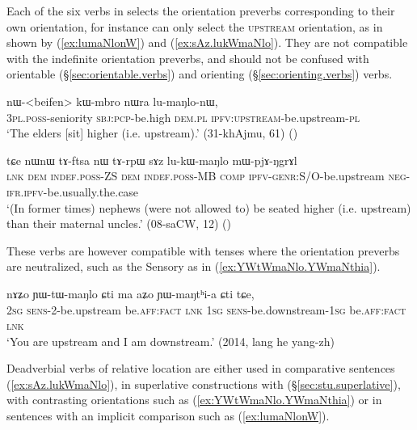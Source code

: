 Each of the six verbs in  selects the orientation preverbs corresponding to their own orientation, for instance  can only select the \textsc{upstream} orientation, as in shown by (\ref{ex:lumaNlonW}) and (\ref{ex:sAz.lukWmaNlo}). They are not compatible with the indefinite orientation preverbs, and should not be confused with orientable (§\ref{sec:orientable.verbs}) and orienting (§\ref{sec:orienting.verbs}) verbs.

\begin{exe}
\ex \label{ex:lumaNlonW}
\gll  nɯ-<beifen> kɯ-mbro nɯra lu-maŋlo-nɯ, \\
\textsc{3pl}.\textsc{poss}-seniority \textsc{sbj}:\textsc{pcp}-be.high \textsc{dem}.\textsc{pl} \textsc{ipfv}:\textsc{upstream}-be.upstream-\textsc{pl} \\
\glt `The elders [sit] higher (i.e. upstream).' (31-khAjmu, 61) ()
\end{exe}

\begin{exe}
\ex \label{ex:sAz.lukWmaNlo}
\gll  tɕe nɯnɯ tɤ-ftsa nɯ tɤ-rpɯ sɤz lu-kɯ-maŋlo mɯ-pjɤ-ŋgrɤl \\
\textsc{lnk} \textsc{dem} \textsc{indef}.\textsc{poss}-ZS \textsc{dem} \textsc{indef}.\textsc{poss}-MB \textsc{comp} \textsc{ipfv}-\textsc{genr}:S/O-be.upstream \textsc{neg}-\textsc{ifr}.\textsc{ipfv}-be.usually.the.case \\
\glt `(In former times) nephews (were not allowed to) be seated higher (i.e. upstream) than their maternal uncles.' (08-saCW, 12) ()
\end{exe}

These verbs are however compatible with tenses where the orientation preverbs are neutralized, such as the Sensory  as in (\ref{ex:YWtWmaNlo.YWmaNthia}).

\begin{exe}
\ex \label{ex:YWtWmaNlo.YWmaNthia}
\gll  nɤʑo ɲɯ-tɯ-maŋlo ɕti ma aʑo ɲɯ-maŋtʰi-a ɕti tɕe, \\
\textsc{2sg} \textsc{sens}-2-be.upstream be.\textsc{aff}:\textsc{fact} \textsc{lnk} \textsc{1sg} \textsc{sens}-be.downstream-\textsc{1sg} be.\textsc{aff}:\textsc{fact} \textsc{lnk} \\
\glt `You are upstream and I am downstream.' (2014, lang he yang-zh)
\end{exe}

Deadverbial verbs of relative location are either used in comparative sentences (\ref{ex:sAz.lukWmaNlo}), in superlative constructions with  (§\ref{sec:stu.superlative}), with contrasting orientations such as (\ref{ex:YWtWmaNlo.YWmaNthia})  or in sentences with an implicit comparison such as (\ref{ex:lumaNlonW}). 


